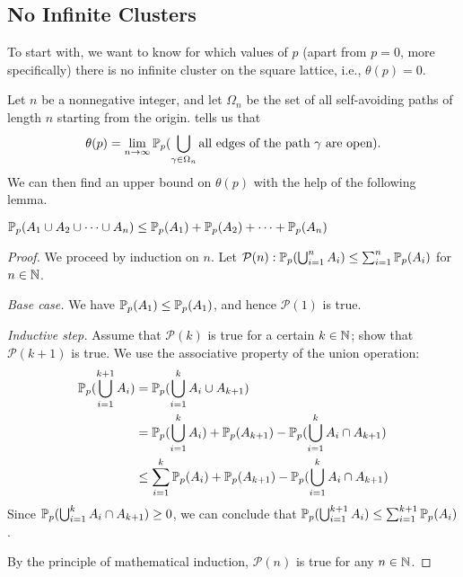 \documentclass[a4paper, 12pt]{article}
\begin{document}
\subsection{No Infinite Clusters}\label{subsec:no_inf_cluster}
To start with, we want to know for which values of $p$ (apart from $p = 0$, more specifically) there is no infinite cluster on the square lattice, i.e., $\theta(p) = 0$.

Let $n$ be a nonnegative integer, and let $\Omega_n$ be the set of all self-avoiding paths of length $n$ starting from the origin.  tells us that
\[\theta(p) = \lim_{n \to \infty} \mathbb{P}_p(\bigcup_{\gamma \in \Omega_n} \text{all edges of the path } \gamma \text{ are open}).\]
We can then find an upper bound on $\theta(p)$ with the help of the following lemma.

\begin{lem}\label{lem:union_bound}
$\mathbb{P}_p(A_1 \cup A_2 \cup \cdots \cup A_n) \leq \mathbb{P}_p(A_1) + \mathbb{P}_p(A_2) + \cdots + \mathbb{P}_p(A_n)$
\end{lem}
\begin{proof}[Proof]
We proceed by induction on $n$. Let $\mathcal{P}(n): \mathbb{P}_p(\bigcup_{i = 1}^n A_i) \leq \sum_{i = 1}^n \mathbb{P}_p(A_i)$ for  $n \in \mathbb{N}$.
\begin{description}
\item \textit{Base case.} We have $\mathbb{P}_p(A_1) \leq \mathbb{P}_p(A_1)$, and hence $\mathcal{P}(1)$ is true.
\item \textit{Inductive step.} Assume that $\mathcal{P}(k)$ is true for a certain $k \in \mathbb{N}$; show that $\mathcal{P}(k + 1)$ is true.
We use the associative property of the union operation:
\begin{align*}
    \mathbb{P}_p(\bigcup_{i = 1}^{k + 1} A_i) 
    &= \mathbb{P}_p(\bigcup_{i = 1}^{k} A_i \cup A_{k + 1})\\
    &= \mathbb{P}_p(\bigcup_{i = 1}^{k} A_i) + \mathbb{P}_p(A_{k + 1}) - \mathbb{P}_p(\bigcup_{i = 1}^{k} A_i \cap A_{k + 1})\\
    &\leq \sum_{i = 1}^k \mathbb{P}_p(A_i) + \mathbb{P}_p(A_{k + 1}) - \mathbb{P}_p(\bigcup_{i = 1}^{k} A_i \cap A_{k + 1})\\
\end{align*}
Since $\mathbb{P}_p(\bigcup_{i = 1}^{k} A_i \cap A_{k + 1}) \geq 0$, we can conclude that $\mathbb{P}_p(\bigcup_{i = 1}^{k + 1} A_i) \leq \sum_{i = 1}^{k + 1} \mathbb{P}_p(A_i)$.
\end{description}
By the principle of mathematical induction, $\mathcal{P}(n)$ is true for any $n \in \mathbb{N}$.
\end{proof}
\end{document}
